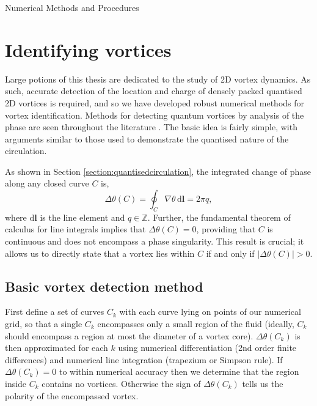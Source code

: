 \begin{chapter}{\label{cha:numerics}Numerical Methods and Procedures}
  

\section{\label{section:vortexidentifying} Identifying vortices}
Large potions of this thesis are dedicated to the study of 2D vortex dynamics. As such, accurate detection of the location and charge of densely packed quantised 2D vortices is required, and so we have developed robust numerical methods for vortex identification. Methods for detecting quantum vortices by analysis of the phase are seen throughout the literature \cite{Simula,saito10,white12,reeves_billam_13,reeves,white_anderson_14,PhysRevLett.113.165302,reeves_2015}. The basic idea is fairly simple, with arguments similar to those used to demonstrate the quantised nature of the circulation.

As shown in Section \ref{section:quantisedcirculation}, the integrated change of phase along any closed curve $C$ is,
\begin{equation}
  \Delta\theta(C) = \oint_C \! \nabla \theta  \, \mathrm{d}\mathbf{l} = 2\pi q,
\end{equation}
where $\mathrm{d}\mathbf{l}$ is the line element and $q\in\mathbb{Z}$. Further, the fundamental theorem of calculus for line integrals \cite{larson2013multivariable} implies that $\Delta\theta(C) = 0$, providing that $C$ is continuous and does not encompass a phase singularity. This result is crucial; it allows us to directly state that a vortex lies within $C$ if and only if $|\Delta\theta(C)| > 0 $.

\subsection{\label{section:vortexloc} Basic vortex detection method}
First define a set of curves $C_k$ with each curve lying on points of our numerical grid, so that a single $C_k$ encompasses only a small region of the fluid (ideally, $C_k$ should encompass a region at most the diameter of a vortex core). $\Delta\theta(C_k)$ is then approximated for each $k$ using numerical differentiation (2nd order finite differences) and numerical line integration (trapezium or Simpson rule). If $\Delta\theta(C_k) = 0$ to within numerical accuracy then we determine that the region inside $C_k$ contains no vortices. Otherwise the sign of $\Delta\theta(C_k)$ tells us the polarity of the encompassed vortex.


\end{chapter}
